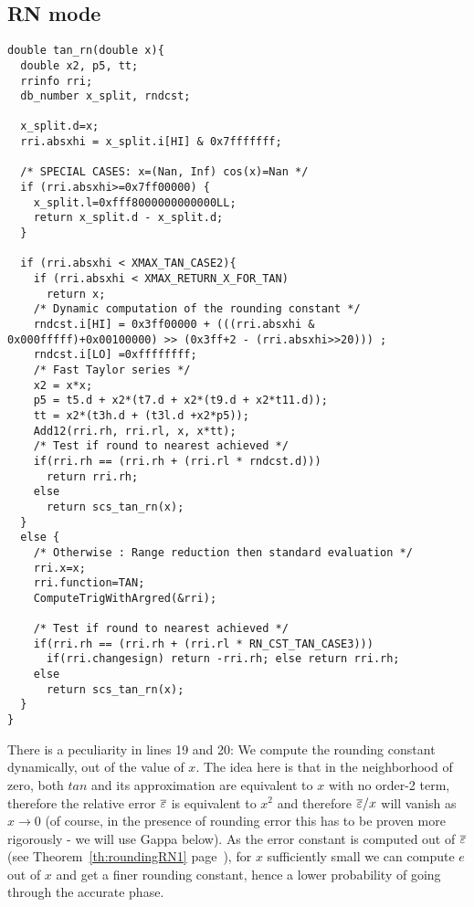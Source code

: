 \subsection{RN mode}
\begin{lstlisting}[caption={Exceptional cases for tangent RN},firstnumber=1]
double tan_rn(double x){
  double x2, p5, tt;
  rrinfo rri;
  db_number x_split, rndcst;

  x_split.d=x;
  rri.absxhi = x_split.i[HI] & 0x7fffffff;

  /* SPECIAL CASES: x=(Nan, Inf) cos(x)=Nan */
  if (rri.absxhi>=0x7ff00000) {
    x_split.l=0xfff8000000000000LL;
    return x_split.d - x_split.d;
  }

  if (rri.absxhi < XMAX_TAN_CASE2){
    if (rri.absxhi < XMAX_RETURN_X_FOR_TAN)
      return x;
    /* Dynamic computation of the rounding constant */
    rndcst.i[HI] = 0x3ff00000 + (((rri.absxhi & 0x000fffff)+0x00100000) >> (0x3ff+2 - (rri.absxhi>>20))) ;
    rndcst.i[LO] =0xffffffff;
    /* Fast Taylor series */
    x2 = x*x;
    p5 = t5.d + x2*(t7.d + x2*(t9.d + x2*t11.d));
    tt = x2*(t3h.d + (t3l.d +x2*p5));
    Add12(rri.rh, rri.rl, x, x*tt);
    /* Test if round to nearest achieved */
    if(rri.rh == (rri.rh + (rri.rl * rndcst.d)))
      return rri.rh;
    else
      return scs_tan_rn(x);
  }
  else {
    /* Otherwise : Range reduction then standard evaluation */
    rri.x=x;
    rri.function=TAN;
    ComputeTrigWithArgred(&rri);

    /* Test if round to nearest achieved */
    if(rri.rh == (rri.rh + (rri.rl * RN_CST_TAN_CASE3)))
      if(rri.changesign) return -rri.rh; else return rri.rh;
    else
      return scs_tan_rn(x);
  }
}
\end{lstlisting}

There is a peculiarity in lines 19 and 20: We compute the rounding
constant dynamically, out of the value of $x$. The idea here is that
in the neighborhood of zero, both $tan$ and its approximation are
equivalent to $x$ with no order-2 term, therefore the relative error
${\overline{\varepsilon}}$ is equivalent to $x^2$ and therefore ${\overline{\varepsilon}}/x$ will vanish
as $x\rightarrow 0$ (of course, in the presence of rounding error this
has to be proven more rigorously - we will use Gappa below).  As the
error constant is computed out of ${\overline{\varepsilon}}$ (see
Theorem~\ref{th:roundingRN1} page~\pageref{th:roundingRN1}), for $x$
sufficiently small we can compute $e$ out of $x$ and get a finer
rounding constant, hence a lower probability of going through the
accurate phase.


